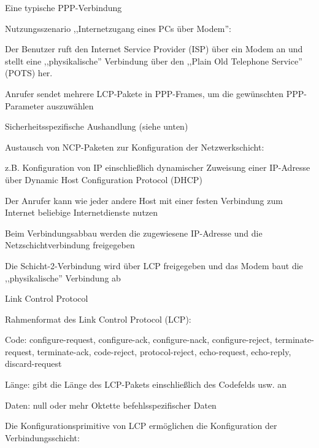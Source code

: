 \documentclass[a4paper]{article}
\begin{document}
\begin{multicols}{3}
      Eine typische PPP-Verbindung

      \begin{itemize*}
            \item
            Nutzungsszenario ,,Internetzugang eines PCs über Modem'':

            \begin{itemize*}
                  \item Der Benutzer ruft den Internet Service Provider (ISP) über ein Modem an und stellt eine ,,physikalische'' Verbindung über den ,,Plain Old Telephone Service'' (POTS) her.
                  \item Anrufer sendet mehrere LCP-Pakete in PPP-Frames, um die gewünschten PPP-Parameter auszuwählen
                  \item Sicherheitsspezifische Aushandlung (siehe unten)
                  \item Austausch von NCP-Paketen zur Konfiguration der Netzwerkschicht:
                  \begin{itemize*} \item z.B. Konfiguration von IP einschließlich dynamischer Zuweisung einer IP-Adresse über Dynamic Host Configuration Protocol (DHCP) \end{itemize*}
                  \item Der Anrufer kann wie jeder andere Host mit einer festen Verbindung zum Internet beliebige Internetdienste nutzen
                  \item Beim Verbindungsabbau werden die zugewiesene IP-Adresse und die Netzschichtverbindung freigegeben
                  \item Die Schicht-2-Verbindung wird über LCP freigegeben und das Modem baut die ,,physikalische'' Verbindung ab
            \end{itemize*}
      \end{itemize*}

      Link Control Protocol

      \begin{itemize*}
            \item
            Rahmenformat des Link Control Protocol (LCP):

            \begin{itemize*}
                  \item Code: configure-request, configure-ack, configure-nack, configure-reject, terminate-request, terminate-ack, code-reject, protocol-reject, echo-request, echo-reply, discard-request
                  \item Länge: gibt die Länge des LCP-Pakets einschließlich des Codefelds usw. an
                  \item Daten: null oder mehr Oktette befehlsspezifischer Daten
            \end{itemize*}
            \item
            Die Konfigurationsprimitive von LCP ermöglichen die Konfiguration der
            Verbindungsschicht:


\end{itemize*}
\end{multicols}
\end{document}
